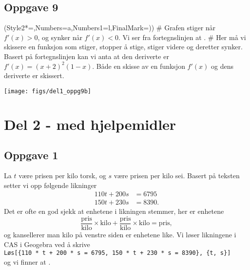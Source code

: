 \subsection*{Oppgave 9}
\begin{easylist}[enumerate]
	\ListProperties(Style2*=,Numbers=a,Numbers1=l,FinalMark={)})
	# Grafen stiger når $f'(x) > 0$, og synker når $f'(x) < 0$.
	Vi ser fra fortegnslinjen at .
	# Her må vi skissere en funksjon som stiger, stopper å stige, stiger videre og deretter synker. Basert på fortegnslinjen kan vi anta at den deriverte er $f'(x) = (x+2)^2 (1-x)$. Både en skisse av en funksjon $f'(x)$ og dens deriverte er skissert.
	\begin{center}
		\texttt{[image: figs/del1\_oppg9b]}
	\end{center}
\end{easylist}



\section*{Del 2 - med hjelpemidler}


\subsection*{Oppgave 1}
La $t$ være prisen per kilo torsk, og $s$ være prisen per kilo sei.
Basert på teksten setter vi opp følgende likninger
\begin{align*}
	110t + 200 s &= 6795\\
	150t + 230 s &= 8390.
\end{align*}
Det er ofte en god sjekk at enhetene i likningen stemmer,  her er enhetene
\begin{equation*}
	\frac{\text{pris}}{\text{kilo}} \times \text{kilo} +
	\frac{\text{pris}}{\text{kilo}} \times \text{kilo} =  \text{pris},
\end{equation*}
og kansellerer man kilo på venstre siden er enhetene like.
Vi løser likningene i CAS i Geogebra ved å skrive \\
\verb|Løs[{110 * t + 200 * s = 6795, 150 * t + 230 * s = 8390}, {t, s}]| \\
og vi finner at .

